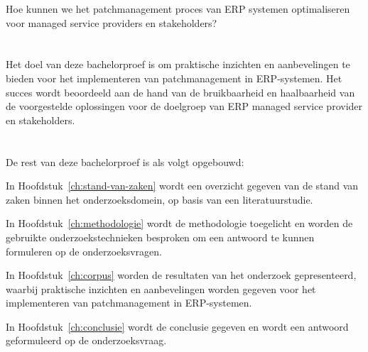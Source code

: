 Hoe kunnen we het patchmanagement proces van ERP systemen optimaliseren voor managed service providers en stakeholders?

\section{}%
\label{sec:onderzoeksdoelstelling}

Het doel van deze bachelorproef is om praktische inzichten en aanbevelingen te bieden voor het implementeren van patchmanagement in ERP-systemen. Het succes wordt beoordeeld aan de hand van de bruikbaarheid en haalbaarheid van de voorgestelde oplossingen voor de doelgroep van ERP managed service provider en stakeholders.

\section{}%
\label{sec:opzet-bachelorproef}

De rest van deze bachelorproef is als volgt opgebouwd:


In Hoofdstuk~\ref{ch:stand-van-zaken} wordt een overzicht gegeven van de stand van zaken binnen het onderzoeksdomein, op basis van een literatuurstudie.

In Hoofdstuk~\ref{ch:methodologie} wordt de methodologie toegelicht en worden de gebruikte onderzoekstechnieken besproken om een antwoord te kunnen formuleren op de onderzoeksvragen.

In Hoofdstuk~\ref{ch:corpus} worden de resultaten van het onderzoek gepresenteerd, waarbij praktische inzichten en aanbevelingen worden gegeven voor het implementeren van patchmanagement in ERP-systemen.

In Hoofdstuk~\ref{ch:conclusie} wordt de conclusie gegeven en wordt een antwoord geformuleerd op de onderzoeksvraag. 

